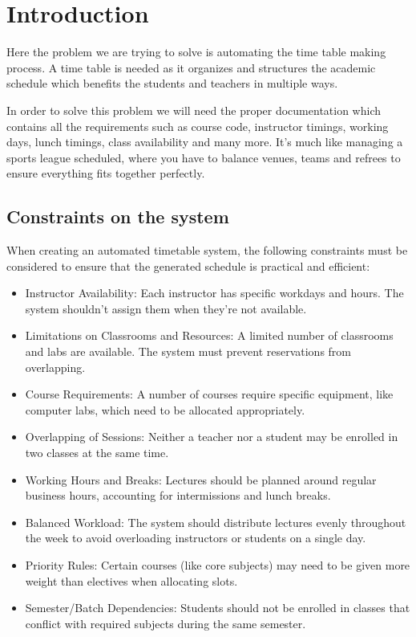\documentclass[12pt]{article}
\begin{document}
\newpage
{}
\setcounter{page}{1}
\tableofcontents
\newpage
\listoffigures
\newpage
\listoftables


\newpage
\thispagestyle{empty}
\clearpage            
\thispagestyle{empty} 
\phantom{a}   



\section{Introduction}
\par \large {Here the problem we are trying to solve is automating the time table making process. A time table is needed as it organizes and structures the academic schedule which benefits the students and teachers in multiple ways.} 

\par \large {In order to solve this problem we will need the proper documentation which contains all the requirements such as course code, instructor timings, working days, lunch timings, class availability and many more. It's much like managing a sports league scheduled, where you have to balance venues, teams and refrees to ensure everything fits together perfectly.}

\subsection{Constraints on the system}
\large {When creating an automated timetable system, the following constraints must be considered to ensure that the generated schedule is practical and efficient: }

\begin{itemize}
    \item \large{ Instructor Availability: Each instructor has specific workdays and hours. The system shouldn't assign them when they're not available.}
    \item \large{Limitations on Classrooms and Resources: A limited number of classrooms and labs are available. The system must prevent reservations from overlapping.}
    \item \large{Course Requirements: A number of courses require specific equipment, like computer labs, which need to be allocated appropriately.}
    \item \large{Overlapping of Sessions: Neither a teacher nor a student may be enrolled in two classes at the same time.}
    \item \large{Working Hours and Breaks: Lectures should be planned around regular business hours, accounting for intermissions and lunch breaks.}
    \item \large{Balanced Workload: The system should distribute lectures evenly throughout the week to avoid overloading instructors or students on a single day.}
    \item \large{Priority Rules: Certain courses (like core subjects) may need to be given more weight than electives when allocating slots.}
    \item \large{Semester/Batch Dependencies: Students should not be enrolled in classes that conflict with required subjects during the same semester.}
\end{itemize}
\end{document}
